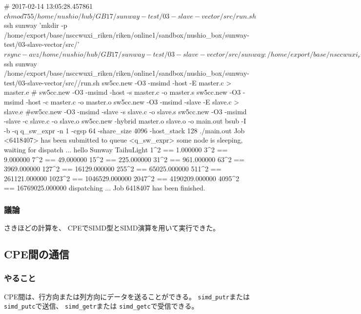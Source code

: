 \begin{code}
# 2017-02-14 13:05:28.457861
$ chmod 755 /home/nushio/hub/GB17/sunway-test/03-slave-vector/src/run.sh
$ ssh sunway 'mkdir -p /home/export/base/nsccwuxi_riken/riken/online1/sandbox/nushio_box/sunway-test/03-slave-vector/src/'
$ rsync -avz /home/nushio/hub/GB17/sunway-test/03-slave-vector/src/ sunway:/home/export/base/nsccwuxi_riken/riken/online1/sandbox/nushio_box/sunway-test/03-slave-vector/src/
sending incremental file list
./
Makefile
master.c
param.h
run.sh
slave.c

sent 1,385 bytes  received 117 bytes  429.14 bytes/sec
total size is 2,064  speedup is 1.37
$ ssh sunway /home/export/base/nsccwuxi_riken/riken/online1/sandbox/nushio_box/sunway-test/03-slave-vector/src//run.sh
sw5cc.new -O3 -msimd -host -E master.c > master.e
#	sw5cc.new -O3 -msimd -host -s master.c -o master.s
sw5cc.new -O3 -msimd -host -c master.c -o master.o
sw5cc.new -O3 -msimd -slave -E slave.c > slave.e
#sw5cc.new -O3 -msimd -slave -s slave.c -o slave.s
sw5cc.new -O3 -msimd -slave -c slave.c -o slave.o
sw5cc.new -hybrid  master.o slave.o -o main.out
bsub -I -b -q q_sw_expr -n 1 -cgsp 64 -share_size 4096 -host_stack 128 ./main.out
Job <6418407> has been submitted to queue <q_sw_expr>
some node is sleeping, waiting for dispatch ...
hello Sunway TaihuLight
1^2 == 1.000000
3^2 == 9.000000
7^2 == 49.000000
15^2 == 225.000000
31^2 == 961.000000
63^2 == 3969.000000
127^2 == 16129.000000
255^2 == 65025.000000
511^2 == 261121.000000
1023^2 == 1046529.000000
2047^2 == 4190209.000000
4095^2 == 16769025.000000
dispatching ...
Job 6418407 has been finished.

\end{code}

\subsubsection{議論}

 さきほどの計算を、
CPEでSIMD型とSIMD演算を用いて実行できた。


\subsection{CPE間の通信}
\subsubsection{やること}

CPE間は、行方向または列方向にデータを送ることができる。
\verb`simd_putr`または
\verb`simd_putc`で送信、
\verb`simd_getr`または
\verb`simd_getc`で受信できる。

